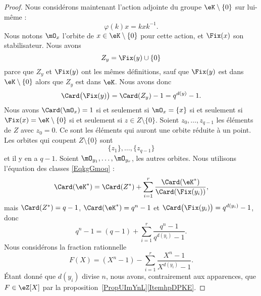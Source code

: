\begin{proof}
	Nous considérons maintenant l'action adjointe du groupe \( \eK\setminus\{ 0 \}\) sur lui-même :
	\begin{equation}
		\varphi(k)x=kxk^{-1}.
	\end{equation}
	Nous notons \( \mO_x\) l'orbite de \( x\in \eK\setminus\{ 0 \}\) pour cette action, et \( \Fix(x)\) son stabilisateur. Nous avons
	\begin{equation}
		Z_y=\Fix(y)\cup\{ 0 \}
	\end{equation}
	parce que \( Z_y\) et \( \Fix(y)\) ont les mêmes définitions, sauf que \( \Fix(y)\) est dans \( \eK\setminus\{ 0 \}\) alors que \( Z_y\) est dans \( \eK\). Nous avons donc
	\begin{equation}
		\Card\big( \Fix(y) \big)=\Card(Z_y)-1=q^{d(y)}-1.
	\end{equation}
	Nous avons \( \Card(\mO_x)=1\) si et seulement si \( \mO_x=\{ x \}\) si et seulement si \( \Fix(x)=\eK\setminus\{ 0 \}\) si et seulement si \( z\in Z\setminus\{ 0 \}\). Soient \( z_0,\ldots, z_{q-1}\) les éléments de \( Z\) avec \( z_0=0\). Ce sont les éléments qui auront une orbite réduite à un point. Les orbites qui coupent \( Z\setminus\{ 0 \}\) sont
	\begin{equation}
		\{ z_1 \},\ldots, \{ z_{q-1} \}
	\end{equation}
	et il y en a \( q-1\). Soient \( \mO_{y_1},\ldots, \mO_{y_r}\), les autres orbites. Nous utilisons l'équation des classes \eqref{EqkgGmoq} :
	\begin{equation}
		\Card(\eK^*)=\Card(Z^*)+\sum_{i=1}^{r}\frac{ \Card(\eK^*) }{ \Card(\Fix(y_i)) },
	\end{equation}
	mais \( \Card(Z^*)=q-1\), \( \Card(\eK^*)=q^n-1\) et \( \Card\big( \Fix(y_i) \big)=q^{d(y_i)}-1\), donc
	\begin{equation}        \label{EqBPBDzE}
		q^n-1=(q-1)+\sum_{i=1}^{r}\frac{ q^n-1 }{ q^{d(y_i)}-1 }.
	\end{equation}
	Nous considérons la fraction rationnelle
	\begin{equation}        \label{EqATGciu}
		F(X)=(X^n-1)-\sum_{i=1}^{r}\frac{ X^n-1 }{ X^{d(y_i)}-1 }.
	\end{equation}
	Étant donné que \( d(y_i)\) divise \( n\), nous avons, contrairement aux apparences, que \( F\in \eZ[X]\) par la proposition~\ref{PropUImYnL}\ref{ItemhpDPKE}.


\end{proof}
